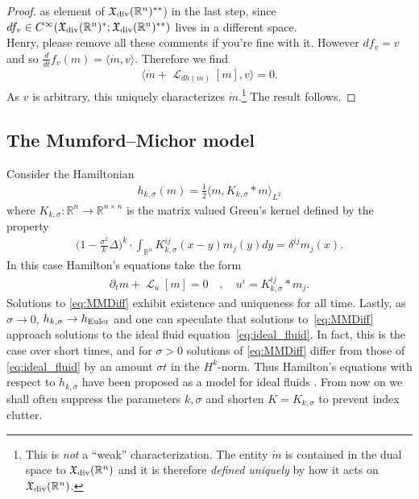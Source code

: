 \documentclass[12pt]{amsart}
\newcommand{\R}{\ensuremath{\mathbb{R}}}
\DeclareMathOperator{\lie}{\mathcal{L}}
\begin{document}
\begin{proof}
{    as element of $\mathfrak{X}_{\rm div}(\R^n)^{**}$) in the last
    step, since $df_v \in C^\infty(\mathfrak{X}_{\rm
      div}(\R^n)^*;\mathfrak{X}_{\rm div}(\R^n)^{**})$ lives in
    a different space.\\
    Henry, please remove all these comments if you're fine with it. }
  However $df_v = v$ and so
  $\frac{d}{dt} f_v(m) = \langle \dot{m} , v \rangle$.  Therefore we find
  \begin{align*}
    \langle \dot{m} + \lie_{dh(m)} [m] , v \rangle = 0.  
  \end{align*}
  As $v$ is arbitrary, this uniquely characterizes $\dot{m}$.\footnote{This is \emph{not} a ``weak'' characterization.  The entity $\dot{m}$ is
  contained in the dual space to $\mathfrak{X}_{\rm div}(\R^n)$ and it is
  therefore \emph{defined uniquely} by how it acts on $\mathfrak{X}_{\rm div}(\R^n)$.}
  The result follows.
\end{proof}

\subsection{The Mumford--Michor model}
\label{sec:MME}
Consider the Hamiltonian
\begin{align*}
  h_{k,\sigma}(m) = \frac{1}{2} \langle m , K_{k,\sigma} * m \rangle_{L^2} 
\end{align*}
where $K_{k,\sigma}:\R^n \to \mathbb{R}^{n \times n}$ is the matrix
valued Green's kernel defined by the property
\begin{align*}
 \Big(1 - \frac{\sigma^2}{k } \Delta \Big)^k \cdot \int_{\R^n} K_{k,\sigma}^{ij}(x - y) m_j(y) dy = \delta^{ij} m_j(x).
\end{align*}
In this case Hamilton's equations take the form
\begin{align}
	\partial_t m+ \lie_u [ m] = 0 \quad , \quad u^i  = K^{ij}_{k,\sigma} * m_j. \label{eq:MMDiff}
\end{align}
Solutions to \eqref{eq:MMDiff} exhibit existence and uniqueness for all time.
Lastly, as $\sigma \to 0$, $h_{k,\sigma} \to h_{\rm Euler}$ and one
can speculate that solutions to~\eqref{eq:MMDiff}
approach solutions to the ideal fluid equation~\eqref{eq:ideal_fluid}.
In fact, this is the case over short times, and for $\sigma > 0$ solutions of \eqref{eq:MMDiff}
differ from those of \eqref{eq:ideal_fluid} by an amount $\sigma t$
in the $H^k$-norm.
Thus Hamilton's equations with respect to $h_{k,\sigma}$ have been proposed
as a model for ideal fluids \cite[Theorems 2 and 3]{MumfordMichor2013}. From now on we shall often suppress the
parameters $k,\sigma$ and shorten $K = K_{k,\sigma}$ to prevent index
clutter.
\end{document}
